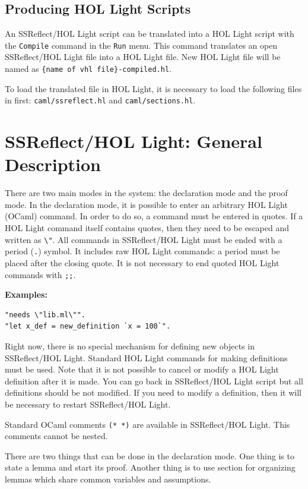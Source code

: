 \documentclass[a4paper]{article}
\begin{document}
\subsection{Producing HOL Light Scripts}
An SSReflect/HOL Light script can be translated into a HOL Light script with the {\tt Compile} command in the {\tt Run} menu. This command translates an open SSReflect/HOL Light file into a HOL Light file. New HOL Light file will be named as {\tt\{name of vhl file\}-compiled.hl}.

To load the translated file in HOL Light, it is necessary to load the following files in first: {\tt caml/ssreflect.hl} and {\tt caml/sections.hl}.


\section{SSReflect/HOL Light: General Description}

There are two main modes in the system: the declaration mode and the proof mode. In the declaration mode, it is possible to enter an arbitrary HOL Light (OCaml) command. In order to do so, a command must be entered in quotes. If a HOL Light command itself contains quotes, then they need to be escaped and written as \verb|\"|. All commands in SSReflect/HOL Light must be ended with a period (\verb|.|) symbol. It includes raw HOL Light commands: a period must be placed after the closing quote. It is not necessary to end quoted HOL Light commands with \verb|;;|.

{\bf Examples:}
\begin{verbatim}
"needs \"lib.ml\"".
"let x_def = new_definition `x = 100`".
\end{verbatim}

Right now, there is no special mechanism for defining new objects in SSReflect/HOL Light. Standard HOL Light commands for making definitions must be used. Note that it is not possible to cancel or modify a HOL Light definition after it is made. You can go back in SSReflect/HOL Light script but all definitions should be not modified. If you need to modify a definition, then it will be necessary to restart SSReflect/HOL Light.

Standard OCaml comments \verb|(* *)| are available in SSReflect/HOL Light. This comments cannot be nested.

There are two things that can be done in the declaration mode. One thing is to state a lemma and start its proof. Another thing is to use section for organizing lemmas which share common variables and assumptions.
\end{document}
